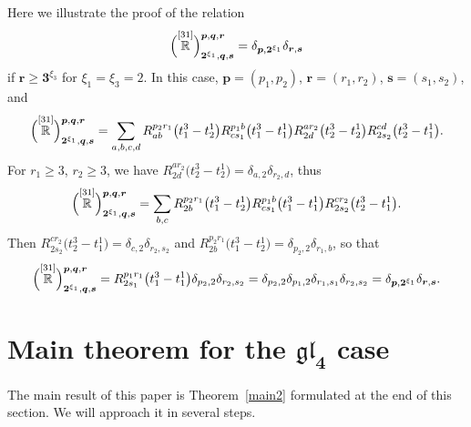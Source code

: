 \documentclass[pdftex]{sigma}
\numberwithin{equation}{section}
\begin{document}
\begin{Example} Here we illustrate the proof of the relation
\[
\Bigl(\overset{[31]}{\mathbb{R}} \Big)^{\boldsymbol{p},\boldsymbol{q},\boldsymbol{r}}_{\boldsymbol{2}^{\xi_1}, \boldsymbol{q},\boldsymbol{s}}=\delta_{\boldsymbol{p},\boldsymbol{2}^{\xi_1}} \delta_{\boldsymbol{r},\boldsymbol{s}}
\]
 if $\boldsymbol{r}\geq \boldsymbol {3}^{\xi_3}$ for $\xi_1=\xi_3=2$. In this case, $ \boldsymbol{p}=(p_1,p_2)$, $\boldsymbol{r}=(r_1,r_2)$, $\boldsymbol{s}=(s_1,s_2)
$, and
\begin{equation*}
\Bigl(\overset{[31]}{\mathbb{R}} \Big)^{\boldsymbol{p},\boldsymbol{q},\boldsymbol{r}}_{\boldsymbol{2}^{\xi_1},\boldsymbol{q},\boldsymbol{s}}= \sum_{a,b,c,d}{R}^{p_2r_1}_{ab}\bigl(t^3_1-t^1_2\bigr) {R}^{p_1 b}_{cs_1}\bigl(t^3_1-t^1_1\bigr) {R}^{ar_2}_{2d}\bigl(t^3_2-t^1_2\bigr) {R}^{cd}_{2s_2}\bigl(t^3_2-t^1_1\bigr).
\end{equation*}
For $r_1\geq 3$, $r_2\geq 3$, we have ${R}^{ar_2}_{2d}\bigl(t^3_2-t^1_2\bigr)=\delta_{a,2} \delta_{r_2,d}$, thus
\begin{equation*}
\Bigl(\overset{[31]}{\mathbb{R}} \Big)^{\boldsymbol{p},\boldsymbol{q},\boldsymbol{r}}_{\boldsymbol{2}^{\xi_1},\boldsymbol{q},\boldsymbol{s}}= \sum_{b,c}{R}^{p_2r_1}_{2b}\bigl(t^3_1-t^1_2\bigr) {R}^{p_1 b}_{cs_1}\bigl(t^3_1-t^1_1\bigr) {R}^{cr_2}_{2s_2}\bigl(t^3_2-t^1_1\bigr).
\end{equation*}
Then ${R}^{cr_2}_{2s_2}\bigl(t^3_2-t^1_1\bigr)=\delta_{c,2} \delta_{r_2,s_2}$ and ${R}^{p_2r_1}_{2b}\bigl(t^3_1-t^1_2\bigr)=\delta_{p_2,2} \delta_{r_1,b}$, so that
\begin{equation*}
\Bigl(\overset{[31]}{\mathbb{R}} \Big)^{\boldsymbol{p},\boldsymbol{q},\boldsymbol{r}}_{\boldsymbol{2}^{\xi_1},\boldsymbol{q},\boldsymbol{s}}= {R}^{p_1 r_1}_{2s_1}\bigl(t^3_1-t^1_1\bigr) \delta_{p_2,2} \delta_{r_2,s_2} =\delta_{p_2,2} \delta_{p_1,2} \delta_{r_1,s_1} \delta_{r_2,s_2}=\delta_{\boldsymbol{p},\boldsymbol{2}^{\xi_1}} \delta_{\boldsymbol{r},\boldsymbol{s}}.
\end{equation*}
\end{Example}

\section[Main theorem for the gl\_4 case]{Main theorem for the $\boldsymbol{\mathfrak{gl}_4}$ case}

The main result of this paper is Theorem~\ref{main2} formulated at the end of this section. We will approach it in several steps.
\end{document}
